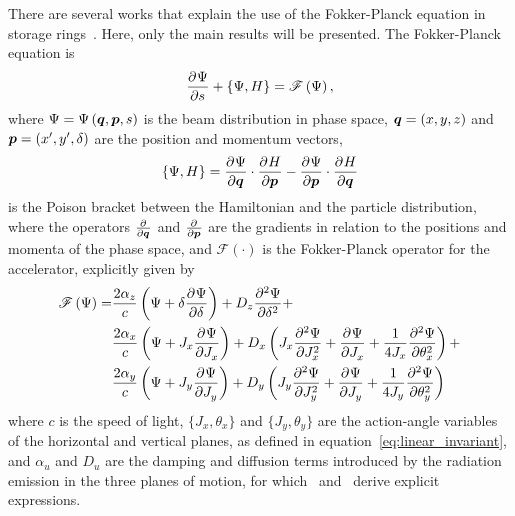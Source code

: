     There are several works that explain the use of the Fokker-Planck equation in storage rings~\cite{Lindberg2016,Suzuki1983,Suzuki1986,Lee1999,Wiedemann2007}. Here, only the main results will be presented. The Fokker-Planck equation is
    \begin{align}\label{eq:fokker_planck_equation}
        \derpar{\Psi}{s} + \poison{\Psi, H} = \mathscr{F}\fof{\Psi},
    \end{align}
    where $\Psi = \Psi\fof{\vect{q},\vect{p}, s}$ is the beam distribution in phase space, $\vect{q}=(x,y,z)$ and $\vect{p}=(x',y',\delta)$ are the position and momentum vectors,
    \begin{align}
        \poison{\Psi, H} = \derpar{\Psi}{\vect{q}}\cdot\derpar{H}{\vect{p}} -
                           \derpar{\Psi}{\vect{p}}\cdot\derpar{H}{\vect{q}}
    \end{align}
    is the Poison bracket between the Hamiltonian and the particle distribution, where the operators $\derpar{}{\vect{q}}$ and $\derpar{}{\vect{p}}$ are the gradients in relation to the positions and momenta of the phase space, and $\mathscr{F}(\cdot)$ is the Fokker-Planck operator for the accelerator, explicitly given by~\cite[eq. 33]{Lindberg2016}
    \begin{align}\label{eq:fokker_planck}\nonumber
        \mathscr{F}\fof{\Psi} = & \frac{2\alpha_z}{c}\fof{
                                            \Psi + \delta\derpar{\Psi}{\delta}
                                      } + D_z \derpar[2]{\Psi}{\delta} + \\\nonumber
                                   & \frac{2\alpha_x}{c}\fof{
                                         \Psi + J_x\derpar{\Psi}{J_x}
                                     } + D_x \fof{J_x\derpar[2]{\Psi}{J_x} +
                                                 \derpar{\Psi}{J_x} +
                                                 \frac{1}{4J_x}\derpar[2]{\Psi}{\theta_x}
                                          } + \\
                                   & \frac{2\alpha_y}{c}\fof{
                                        \Psi + J_y\derpar{\Psi}{J_y}
                                     } + D_y \fof{J_y\derpar[2]{\Psi}{J_y} +
                                                 \derpar{\Psi}{J_y} +
                                                 \frac{1}{4J_y}\derpar[2]{\Psi}{\theta_y}
                                         }
    \end{align}
    where $c$ is the speed of light, $\{J_x, \theta_x\}$ and $\{J_y, \theta_y\}$ are the action-angle variables of the horizontal and vertical planes, as defined in equation~\eqref{eq:linear_invariant}, and $\alpha_u$ and $D_u$ are the damping and diffusion terms introduced by the radiation emission in the three planes of motion, for which~ and~ derive explicit expressions.

